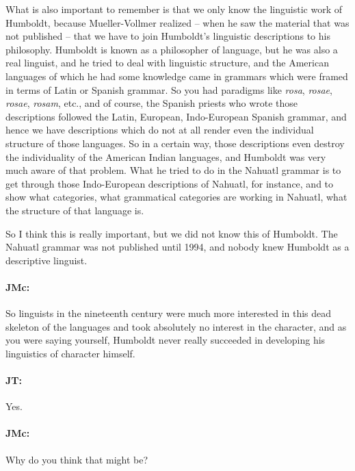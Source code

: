 \documentclass[output=paper]{langscibook}
\begin{document}
What is also important to remember is that we only know the linguistic work of Humboldt, because Mueller-Vollmer realized – when he saw the material that was not published – that we have to join Humboldt’s linguistic descriptions to his philosophy. Humboldt is known as a philosopher of language, but he was also a real linguist, and he tried to deal with linguistic structure, and the American languages of which he had some knowledge came in grammars which were framed in terms of Latin or Spanish grammar. So you had paradigms like \textit{rosa}, \textit{rosae}, \textit{rosae}, \textit{rosam}, etc., and of course, the Spanish priests who wrote those descriptions followed the Latin, European, Indo-European Spanish grammar, and hence we have descriptions which do not at all render even the individual structure of those languages. So in a certain way, those descriptions even destroy the individuality of the American Indian languages, and Humboldt was very much aware of that problem. What he tried to do in the Nahuatl grammar is to get through those Indo-European descriptions of Nahuatl, for instance, and to show what categories, what grammatical categories are working in Nahuatl, what the structure of that language is.


  So I think this is really important, but we did not know this of Humboldt. The Nahuatl grammar was not published until 1994, and nobody knew Humboldt as a descriptive linguist.


\paragraph*{JMc:} So linguists in the nineteenth century were much more interested in this dead skeleton of the languages and took absolutely no interest in the character, and as you were saying yourself, Humboldt never really succeeded in developing his linguistics of character himself.


\paragraph*{JT:} Yes.


\paragraph*{JMc:} Why do you think that might be?
\end{document}
